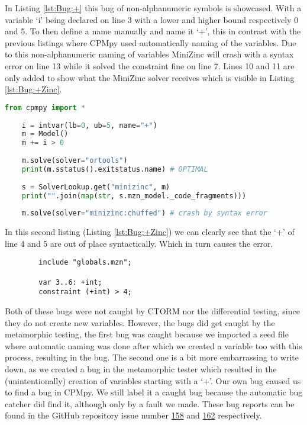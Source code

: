 In Listing \ref{lst:Bug:+} this bug of non-alphanumeric symbols is showcased. With a variable ‘i’ being declared on line 3 with a lower and higher bound respectively 0 and 5. To then define a name manually and name it ‘+’, this in contrast with the previous listings where CPMpy used automatically naming of the variables.  Due to this non-alphanumeric naming of variables MiniZinc will crash with a syntax error on line 13 while it solved the constraint fine on line 7. Lines 10 and 11 are only added to show what the MiniZinc solver receives which is visible in Listing \ref{lst:Bug:+Zinc}. 

\begin{lstlisting}[language=python, label={lst:Bug:+}, caption={A bug showcasing that the naming of CPMpy’s variables is less strict than MiniZinc’s.}]
	from cpmpy import *
	
	i = intvar(lb=0, ub=5, name="+")
	m = Model()
	m += i > 0
	
	m.solve(solver="ortools")
	print(m.sstatus().exitstatus.name) # OPTIMAL
	
	s = SolverLookup.get("minizinc", m)
	print("".join(map(str, s.mzn_model._code_fragments)))
	
	m.solve(solver="minizinc:chuffed") # crash by syntax error
\end{lstlisting}

\noindent In this second listing (Listing \ref{lst:Bug:+Zinc}) we can clearly see that the ‘+’ of line 4 and 5 are out of place syntactically. Which in turn causes the error.

\begin{lstlisting}[language=minizinc, label={lst:Bug:+Zinc}, caption={The resulting Zinc code from Listing \ref{lst:Bug:+} used by Minzinc.}]
		% Generated by CPMpy
		include "globals.mzn";
		
		var 3..6: +int;
		constraint (+int) > 4;
\end{lstlisting}

Both of these bugs were not caught by CTORM nor the differential testing, since they do not create new variables. However, the bugs did get caught by the metamorphic testing, the first bug was caught because we imported a seed file where automatic naming was done after which we created a variable too with this process, resulting in the bug. The second one is a bit more embarrassing to write down, as we created a bug in the metamorphic tester which resulted in the (unintentionally) creation of variables starting with a ‘+’. Our own bug caused us to find a bug in CPMpy. We still label it a caught bug because the automatic bug catcher did find it, although only by a fault we made. These bug reports can be found in the GitHub repository issue number \href{https://github.com/CPMpy/cpmpy/issues/158}{158} and \href{https://github.com/CPMpy/cpmpy/issues/162}{162} respectively.



